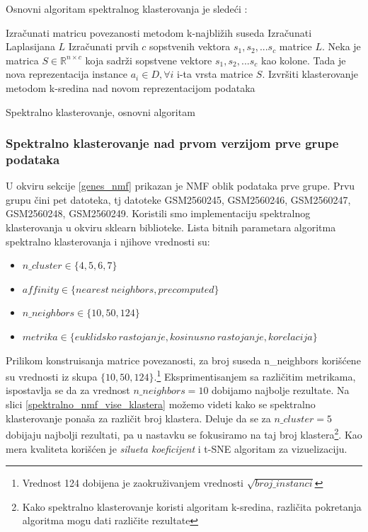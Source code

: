 \documentclass[a4paper]{article}
\begin{document}
Osnovni algoritam spektralnog klasterovanja je sledeći \cite{von2007tutorial}:


\begin{minipage}{0.9\linewidth}%
\begin{algorithm}[H]
\SetAlgoLined
{}
Izračunati matricu povezanosti metodom k-najbližih suseda\;
Izračunati Laplasijana $L$\;
Izračunati prvih $c$ sopstvenih vektora $s_1, s_2, ... s_c$ matrice $L$. Neka je matrica $S \in \mathbb{R}^{n \times c}$ koja sadrži sopstvene vektore $s_1, s_2, ... s_c$ kao kolone. Tada je nova reprezentacija instance $a_i \in D, \forall i$ i-ta vrsta matrice $S$.\;
Izvršiti klasterovanje metodom k-sredina nad novom reprezentacijom podataka\;
 \caption{Spektralno klasterovanje, osnovni algoritam}
\end{algorithm}
\end{minipage}

\verb||

\subsubsection{Spektralno klasterovanje nad prvom verzijom prve grupe podataka}
U okviru sekcije \ref{genes_nmf} prikazan je NMF oblik podataka prve grupe. Prvu grupu čini pet datoteka, tj datoteke GSM2560245, GSM2560246, GSM2560247, GSM2560248, GSM2560249. Koristili smo implementaciju spektralnog klasterovanja u okviru sklearn biblioteke. Lista bitnih parametara algoritma spektralno klasterovanja i njihove vrednosti su:
\begin{itemize}
\item $n\_cluster \in \{4, 5, 6, 7\}$
\item $affinity \in  \{nearest\ neighbors, precomputed\}$
\item $n\_neighbors \in \{10, 50, 124\}$
\item $metrika \in \{euklidsko\ rastojanje, kosinusno\ rastojanje, korelacija\}$
\end{itemize}

Prilikom konstruisanja matrice povezanosti, za broj suseda n\_neighbors korišćene su vrednosti iz skupa
$\{10, 50, 124\}$.\footnote{Vrednost 124 dobijena je zaokruživanjem vrednosti $\sqrt{broj\_instanci}$} Eksprimentisanjem sa različitim metrikama, ispostavlja se da za vrednost $n\_neighbors = 10$ dobijamo najbolje rezultate. Na slici \ref{spektralno_nmf_vise_klastera} možemo videti kako se spektralno klasterovanje ponaša za različit broj klastera. Deluje da se za $n\_cluster = 5$ dobijaju najbolji rezultati, pa u nastavku se fokusiramo na taj broj klastera\footnote{Kako spektralno klasterovanje koristi algoritam k-sredina, različita pokretanja algoritma mogu dati različite rezultate}. Kao mera kvaliteta korišćen je \textit{silueta koeficijent} i t-SNE algoritam za vizuelizaciju.
\end{document}
